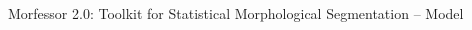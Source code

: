 \documentclass[final]{beamer} %
\DeclareMathOperator*{\argmin}{arg\,min}
\newcommand{\seq}[1]{\boldsymbol{#1}}
\newcommand{\params}{\boldsymbol{\theta}}
\newcommand{\data}{\seq{D}}
\newcommand{\hatdata}{\seq{\hat{D}}}
\newcommand{\token}{\phi}
\begin{document}
\begin{frame}{Morfessor 2.0: Toolkit for Statistical Morphological Segmentation -- Model}
\begin{columns}
\begin{column}{.4\textwidth}
%
%            
%
%
%
%
%






\end{column}
\end{columns}
\end{frame}
\end{document}
